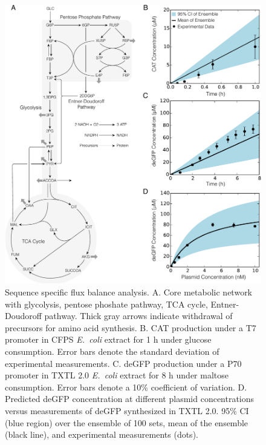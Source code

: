 \documentclass[journal=asbcd6,manuscript=article]{achemso}
\begin{document}
\begin{figure}[t!]
\centering
\includegraphics[width=1.00\textwidth]{./Figures/ssFBA_network.pdf}
\caption{Sequence specific flux balance analysis. A. Core metabolic network with glycolysis, pentose phoshate pathway, TCA cycle, Entner-Doudoroff pathway. Thick gray arrows indicate withdrawal of precursors for amino acid synthesis. B. CAT production under a T7 promoter in CFPS \textit{E.~coli} extract for 1 h under glucose consumption. Error bars denote the standard deviation of experimental measurements. C. deGFP production under a P70 promoter in TXTL 2.0 \textit{E.~coli} extract for 8 h under maltose consumption. Error bars denote a 10\% coefficient of variation. D. Predicted deGFP concentration at different plasmid concentrations versus measurements of deGFP synthesized in TXTL 2.0. 95\% CI (blue region) over the ensemble of 100 sets, mean of the ensemble (black line), and experimental measurements (dots).}
\label{fig:network}
\end{figure}
\end{document}

